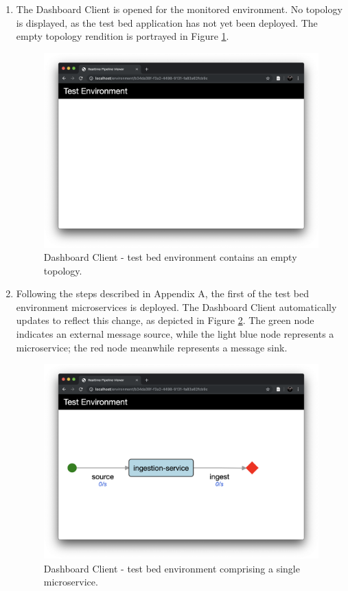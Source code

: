 \begin{enumerate}
\item The Dashboard Client is opened for the monitored environment. No topology is displayed, as the test bed application has not yet been deployed. The empty topology rendition is portrayed in Figure \ref{walkthough_empty_topology}.

 \begin{figure}[H]
	\centering  
	\includegraphics[scale=0.3]{figures/walkthrough/env-zero-nodes.png}
	\caption{Dashboard Client - test bed environment contains an empty topology.}
	\label{walkthough_empty_topology}
\end{figure}

\item Following the steps described in Appendix A, the first of the test bed environment microservices is deployed. The Dashboard Client automatically updates to reflect this change, as depicted in Figure \ref{walkthough_one_node_topology}. The green node indicates an external message source, while the light blue node represents a microservice; the red node meanwhile represents a message sink.

\begin{figure}[H]
	\centering  
	\includegraphics[scale=0.3]{figures/walkthrough/env-one-node.png}
	\caption{Dashboard Client - test bed environment comprising a single microservice.}
	\label{walkthough_one_node_topology}
\end{figure}


\end{enumerate}
